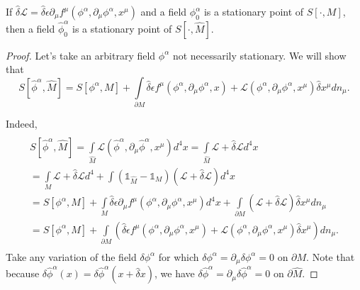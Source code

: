 \documentclass[main.tex]{subfiles}
\begin{document}
\begin{lemma}
If $\hat{\delta} \mathcal{L} = \hat{\delta} \epsilon \partial_\mu f^\mu(\phi^\alpha, \partial_\mu \phi^\alpha, x^\mu)$ and a field $\phi_0^\alpha$ is a stationary point of $S[\cdot, M]$, then a field $\hat{\phi}_0^\alpha$ is a stationary point of $S[\cdot, \hat{M}]$.
\end{lemma}
\begin{proof}
Let's take an arbitrary field $\phi^\alpha$ not necessarily stationary.
We will show that
\begin{equation}
\label{noether-boudary}
S[\hat{\phi}^\alpha, \hat{M}] = S[\phi^\alpha, M] + \int\limits_{\partial M} \hat{\delta}\epsilon f^\mu(\phi^\alpha, \partial_\mu \phi^\alpha, x) + 
\mathcal{L}(\phi^\alpha, \partial_\mu \phi^\alpha, x^\mu)\hat{\delta}x^\mu dn_\mu.
\end{equation}

Indeed,
\begin{multline*}
\\
S[\hat{\phi}^\alpha, \hat{M}] = \int\limits_{\hat{M}}
\mathcal{L}(\hat{\phi}^\alpha, \partial_\mu \hat{\phi}^\alpha, x^\mu) d^4 x = \int\limits_{\hat{M}} \mathcal{L} + \hat{\delta} \mathcal{L} d^4 x
\\ = \int\limits_{M} \mathcal{L} + \hat{\delta} \mathcal{L} d^4 + \int (\mathds{1}_{\hat{M}} - \mathds{1}_{M})( \mathcal{L} + \hat{\delta} \mathcal{L}) d^4 x
\\ = S[\phi^\alpha, M] + \int\limits_M  \hat{\delta} \epsilon \partial_\mu f^\mu(\phi^\alpha, \partial_\mu \phi^\alpha, x^\mu) d^4x
+ \int\limits_{\partial M} (\mathcal{L} + \hat{\delta}\mathcal{L}) \hat{\delta} x^\mu dn_\mu
\\ = S[\phi^\alpha, M] + \int\limits_{\partial M} (\hat{\delta}\epsilon f^\mu(\phi^\alpha, \partial_\mu \phi^\alpha, x^\mu) + 
\mathcal{L}(\phi^\alpha, \partial_\mu \phi^\alpha, x^\mu)\hat{\delta}x^\mu) dn_\mu.
\\
\end{multline*}
Take any variation of the field $\delta \phi^\alpha$ for which $\delta \phi^\alpha = \partial_\mu \delta \phi^\alpha = 0$ on $\partial M$. Note that because $\delta \hat{\phi}^\alpha (x) = \delta \hat{\phi}^\alpha (x + \hat{\delta}x)$, we have  $\delta \hat{\phi}^\alpha = \partial_\mu \delta \hat{\phi}^\alpha = 0$ on $\partial \hat{M}$.


\end{proof}
\end{document}
